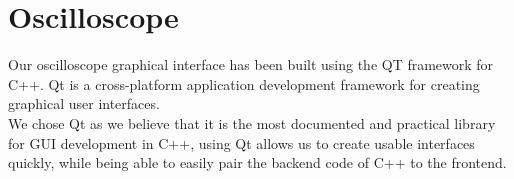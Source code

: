 \section{Oscilloscope}
    Our oscilloscope graphical interface has been built using the QT framework for C++. Qt is a cross-platform application development framework for creating graphical user interfaces. \\
    We chose Qt as we believe that it is the most documented and practical library for GUI development in C++, using Qt allows us to create usable interfaces quickly, while being able to easily pair the backend code of C++ to the frontend.
